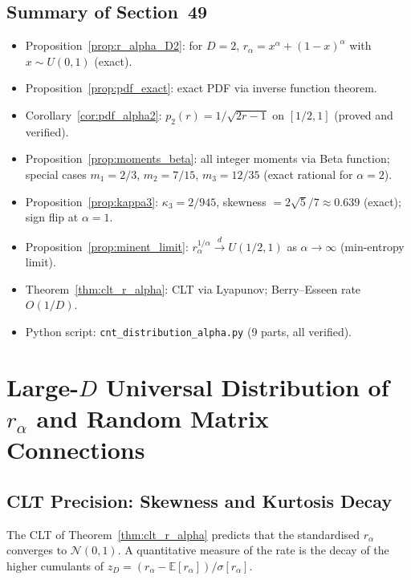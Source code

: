 \documentclass[12pt,a4paper]{article}
\begin{document}
\subsection*{Summary of Section~49}
\begin{itemize}
\item Proposition~\ref{prop:r_alpha_D2}: for $D=2$, $r_\alpha=x^\alpha+(1-x)^\alpha$ with $x\sim U(0,1)$ (exact).
\item Proposition~\ref{prop:pdf_exact}: exact PDF via inverse function theorem.
\item Corollary~\ref{cor:pdf_alpha2}: $p_2(r)=1/\sqrt{2r-1}$ on $[1/2,1]$ (proved and verified).
\item Proposition~\ref{prop:moments_beta}: all integer moments via Beta function; special cases $m_1=2/3$, $m_2=7/15$, $m_3=12/35$ (exact rational for $\alpha=2$).
\item Proposition~\ref{prop:kappa3}: $\kappa_3=2/945$, skewness $=2\sqrt5/7\approx0.639$ (exact); sign flip at $\alpha=1$.
\item Proposition~\ref{prop:minent_limit}: $r_\alpha^{1/\alpha}\xrightarrow{d}U(1/2,1)$ as $\alpha\to\infty$ (min-entropy limit).
\item Theorem~\ref{thm:clt_r_alpha}: CLT via Lyapunov; Berry--Esseen rate $O(1/D)$.
\item Python script: \texttt{cnt\_distribution\_alpha.py} (9 parts, all verified).
\end{itemize}

\section{Large-$D$ Universal Distribution of $r_\alpha$ and Random Matrix Connections}
\label{sec:rmt}

\subsection{CLT Precision: Skewness and Kurtosis Decay}
\label{subsec:clt_precision}

The CLT of Theorem~\ref{thm:clt_r_alpha} predicts that the standardised
$r_\alpha$ converges to $\mathcal{N}(0,1)$.  A quantitative measure of
the rate is the decay of the higher cumulants of $z_D=(r_\alpha-\mathbb{E}[r_\alpha])/\sigma[r_\alpha]$.
\end{document}
